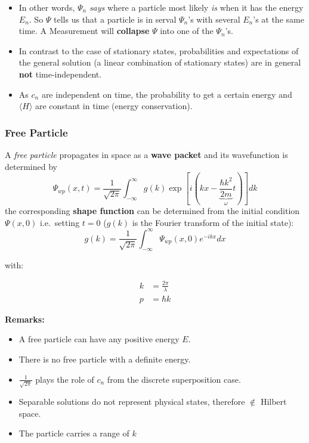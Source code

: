 \begin{itemize}
    \item In other words, $\Psi_n$ \textit{says} where a particle most likely \textit{is} when it has the energy $E_n$. So $\Psi$ tells us that a particle is in serval $\Psi_n$'s with several $E_n$'s at the same time. A Measurement will \textbf{collapse} $\Psi$ into one of the $\Psi_n$'s.
    \item In contrast to the case of stationary states, probabilities and expectations of the general solution (a linear combination of stationary states) are in general \textbf{not} time-independent.
    \item As $c_n$ are independent on time, the probability to get a certain energy and $\langle H\rangle$ are constant in time (energy conservation).
\end{itemize}

\subsubsection{Free Particle}
A \textit{free particle} propagates in space as a \textbf{wave packet} and its wavefunction is determined by
\noindent\begin{equation*}
    \Psi_{wp}(x,t)=\frac{1}{\sqrt{2\pi}}\int_{-\infty}^{\infty}g(k)\exp\left[i\left(kx- \underbrace{\frac{\hbar k^{2}}{2m}}_{\omega}t\right)\right]dk
\end{equation*}
the corresponding \textbf{shape function} can be determined from the initial condition $\Psi(x,0)$ i.e.\ setting $t=0$ ($g(k)$ is the Fourier transform of the initial state):
\noindent\begin{equation*}
    g(k)=\frac{1}{\sqrt{2\pi}}\int_{-\infty}^{\infty}\Psi_{wp}(x,0)e^{-ikx}dx
\end{equation*}

with:

\begin{align*}
    k & = \frac{2\pi}{\lambda} \\
    p & = \hbar k
\end{align*}

\textbf{Remarks:}

\begin{itemize}
    \item A free particle can have any positive energy $E$.
    \item There is no free particle with a definite energy.
    \item $\frac{1}{\sqrt{2\pi}}$ plays the role of $c_n$ from the discrete superposition case.
    \item Separable solutions do not represent physical states, therefore $\notin$ Hilbert space.
    \item The particle carries a range of $k$
\end{itemize}

